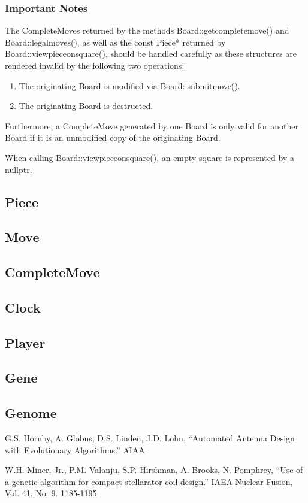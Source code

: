 \documentclass[letter]{article}
\newcommand{\code}[1]{#1}
\renewcommand\_{\textunderscore\allowbreak}
\begin{document}
\subsubsection{Important Notes}
The \code{Complete\_Move}s returned by the methods \code{Board::get\_complete\_move()} and \code{Board::legal\_moves()}, as well as the \code{const Piece*} returned by \code{Board::view\_piece\_on\_square()}, should be handled carefully as these structures are rendered invalid by the following two operations:
\begin{enumerate}
	\item The originating \code{Board} is modified via \code{Board::submit\_move()}.
	\item The originating \code{Board} is destructed.
\end{enumerate}
Furthermore, a \code{Complete\_Move} generated by one \code{Board} is only valid for another \code{Board} if it is an unmodified copy of the originating \code{Board}.

When calling \code{Board::view\_piece\_on\_square()}, an empty square is represented by a \code{nullptr}.

\subsection{Piece}

\subsection{Move}

\subsection{Complete\_Move}

\subsection{Clock}

\subsection{Player}

\subsection{Gene}

\subsection{Genome}



\begin{thebibliography}{9}

G.S. Hornby, A. Globus, D.S. Linden, J.D. Lohn, ``Automated Antenna Design with Evolutionary Algorithms.'' AIAA

W.H. Miner, Jr., P.M. Valanju, S.P. Hirshman, A. Brooks, N. Pomphrey, ``Use of a genetic algorithm for compact stellarator coil design.'' IAEA Nuclear Fusion, Vol. 41, No. 9. 1185-1195

\end{thebibliography}
\end{document}
